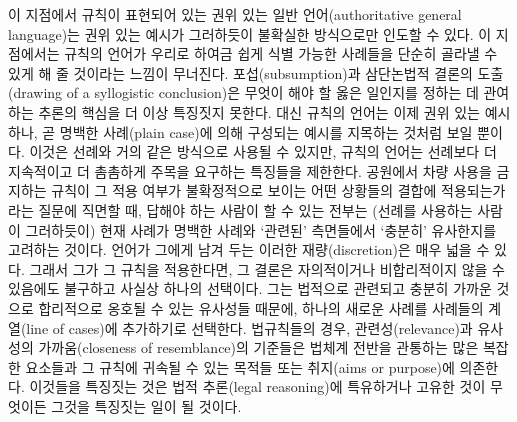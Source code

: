 이 지점에서 규칙이 표현되어 있는 권위 있는 일반 언어(authoritative
general language)는 권위 있는 예시가 그러하듯이 불확실한 방식으로만
인도할 수 있다. 이 지점에서는 규칙의 언어가 우리로 하여금 쉽게 식별
가능한 사례들을 단순히 골라낼 수 있게 해 줄 것이라는 느낌이 무너진다.
포섭(subsumption)과 삼단논법적 결론의 도출(drawing of a syllogistic
conclusion)은 무엇이 해야 할 옳은 일인지를 정하는 데 관여하는 추론의
핵심을 더 이상 특징짓지 못한다. 대신 규칙의 언어는 이제 권위 있는 예시
하나, 곧 명백한 사례(plain case)에 의해 구성되는 예시를 지목하는 것처럼
보일 뿐이다. 이것은 선례와 거의 같은 방식으로 사용될 수 있지만, 규칙의
언어는 선례보다 더 지속적이고 더 촘촘하게 주목을 요구하는 특징들을
제한한다. 공원에서 차량 사용을 금지하는 규칙이 그 적용 여부가
불확정적으로 보이는 어떤 상황들의 결합에 적용되는가라는 질문에 직면할
때, 답해야 하는 사람이 할 수 있는 전부는 (선례를 사용하는 사람이
그러하듯이) 현재 사례가 명백한 사례와 ‘관련된’ 측면들에서 ‘충분히’
유사한지를 고려하는 것이다. 언어가 그에게 남겨 두는 이러한
재량(discretion)은 매우 넓을 수 있다. 그래서 그가 그 규칙을 적용한다면,
그 결론은 자의적이거나 비합리적이지 않을 수 있음에도 불구하고 사실상
하나의 선택이다. 그는 법적으로 관련되고 충분히 가까운 것으로 합리적으로
옹호될 수 있는 유사성들 때문에, 하나의 새로운 사례를 사례들의 계열(line
of cases)에 추가하기로 선택한다. 법규칙들의 경우, 관련성(relevance)과
유사성의 가까움(closeness of resemblance)의 기준들은 법체계 전반을
관통하는 많은 복잡한 요소들과 그 규칙에 귀속될 수 있는 목적들 또는
취지(aims or purpose)에 의존한다. 이것들을 특징짓는 것은 법적 추론(legal
reasoning)에 특유하거나 고유한 것이 무엇이든 그것을 특징짓는 일이 될
것이다.

